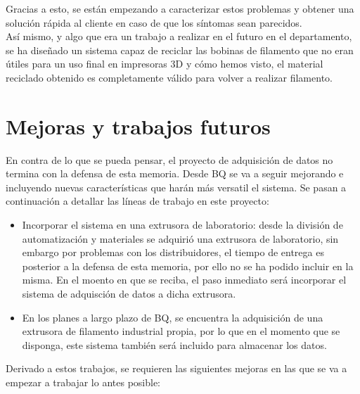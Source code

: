 Gracias a esto, se están empezando a caracterizar estos problemas y obtener una solución rápida al cliente en caso de que los síntomas sean parecidos.\\

Así mismo, y algo que era un trabajo a realizar en el futuro en el departamento, se ha diseñado un sistema capaz de reciclar las bobinas de filamento que no eran útiles para un uso final en impresoras 3D y cómo hemos visto, el material reciclado obtenido es completamente válido para volver a realizar filamento.

\section{Mejoras y trabajos futuros}

En contra de lo que se pueda pensar, el proyecto de adquisición de datos no termina con la defensa de esta memoria. Desde BQ se va a seguir mejorando e incluyendo nuevas características que harán más versatil el sistema. Se pasan a continuación a detallar las líneas de trabajo en este proyecto:

\begin{itemize}
	\item{Incorporar el sistema en una extrusora de laboratorio: desde la división de automatización y materiales se adquirió una extrusora de laboratorio, sin embargo por problemas con los distribuidores, el tiempo de entrega es posterior a la defensa de esta memoria, por ello no se ha podido incluir en la misma. En el moento en que se reciba, el paso inmediato será incorporar el sistema de adquisción de datos a dicha extrusora.}
	\item{En los planes a largo plazo de BQ, se encuentra la adquisición de una extrusora de filamento industrial propia, por lo que en el momento que se disponga, este sistema también será incluido para almacenar los datos.}
\end{itemize}

Derivado a estos trabajos, se requieren las siguientes mejoras en las que se va a empezar a trabajar lo antes posible:

